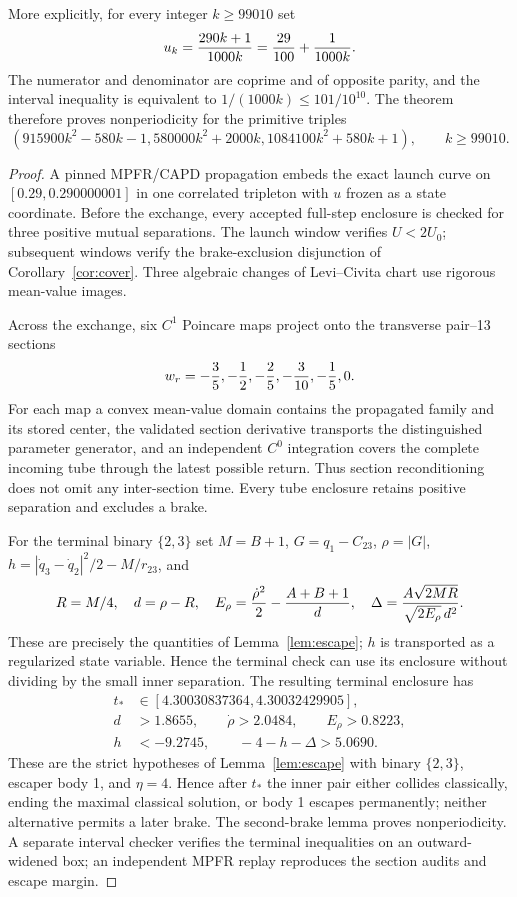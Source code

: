 More explicitly, for every integer $k\ge99010$ set
\[
 u_k={290k+1\over1000k}={29\over100}+{1\over1000k}.
\]
The numerator and denominator are coprime and of opposite parity, and the
interval inequality is equivalent to $1/(1000k)\le101/10^{10}$.  The theorem
therefore proves nonperiodicity for the primitive triples
\[
 \left(915900k^2-580k-1,
       580000k^2+2000k,
       1084100k^2+580k+1\right),
 \qquad k\ge99010.
\]
\begin{proof}
A pinned MPFR/CAPD propagation embeds the exact launch curve on
$[0.29,0.290000001]$ in one correlated tripleton with $u$ frozen as a state
coordinate.  Before the
exchange, every accepted full-step enclosure is checked for three positive
mutual separations. The launch window verifies $U<2U_0$; subsequent windows
verify the brake-exclusion disjunction of Corollary~\ref{cor:cover}.  Three algebraic changes of Levi--Civita chart use rigorous
mean-value images.

Across the exchange, six $C^1$ Poincare maps project onto the transverse
pair--13 sections
\[
 w_r=-{3\over5},-{1\over2},-{2\over5},-{3\over10},-{1\over5},0.
\]
For each map a convex mean-value domain contains the propagated family and
its stored center, the validated section derivative transports the
distinguished parameter generator, and an independent $C^0$ integration
covers the complete incoming tube through the latest possible return.
Thus section reconditioning does not omit any inter-section time.  Every
tube enclosure retains positive separation and excludes a brake.

For the terminal binary $\{2,3\}$ set $M=B+1$, $G=q_1-C_{23}$,
$\rho=|G|$, $h=|\dot q_3-\dot q_2|^2/2-M/r_{23}$, and
\[
 R=M/4,\quad d=\rho-R,\quad
 E_\rho={\dot\rho^2\over2}-{A+B+1\over d},\quad
 \Delta={A\sqrt{2MR}\over\sqrt{2E_\rho}\,d^2}.
\]
These are precisely the quantities of Lemma~\ref{lem:escape}; $h$ is
transported as a regularized state variable. Hence the terminal check can
use its enclosure without dividing by the small inner separation.
The resulting terminal enclosure has
\[
\begin{split}
t_*&\in[4.30030837364,4.30032429905],\\
d&>1.8655,\qquad \dot\rho>2.0484,\qquad E_\rho>0.8223,\\
h&<-9.2745,\qquad -4-h-\Delta>5.0690 .
\end{split}
\]
These are the strict hypotheses of Lemma~\ref{lem:escape}
with binary $\{2,3\}$, escaper body 1, and $\eta=4$.  Hence after $t_*$ the
inner pair either collides classically, ending the maximal classical
solution, or body 1 escapes permanently; neither alternative permits a later
brake. The second-brake lemma proves nonperiodicity. A separate interval
checker verifies the terminal inequalities on an outward-widened box;
an independent MPFR replay reproduces the section audits and escape margin.


\end{proof}
